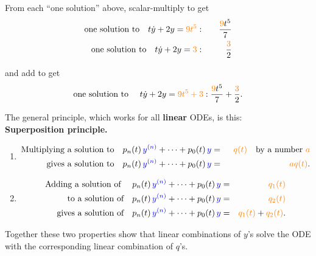 From each ``one solution'' above, scalar-multiply to get
\begin{eqnarray*}
  \displaystyle  \text {one solution to} \quad
  \displaystyle  t \dot{y} + 2 y = {\color{orange}{9}} {\color{orange}{t^5}}
  & : & \quad \displaystyle  \frac{{\color{orange}{9}} t^5}{7} \\ 
  \displaystyle  \text {one solution to} \quad
  \displaystyle  t \dot{y} + 2 y = {\color{orange}{3}}
  & : & \quad \displaystyle  \frac{{\color{orange}{3}}}{2}   
\end{eqnarray*}

and add to get
\begin{equation*}
  \displaystyle  \text {one solution to }\quad
  \displaystyle  t \dot{y} + 2 y = {\color{orange}{9}} {\color{orange}{t^5+{}}} {\color{orange}{3}} :
  \displaystyle  \frac{{\color{orange}{9}} t^5}{7} + \frac{{\color{orange}{3}} }{2} .
\end{equation*}

The general principle, which works for all \textbf{linear} ODEs, is this:\\

\textbf{Superposition principle.} \\
\begin{enumerate}
\item
  \begin{eqnarray*}
    \displaystyle  \text {Multiplying a solution to}\quad p_ n(t) \,
    {\color{blue}{y^{(n)}}}  + \cdots + p_0(t) \,  {\color{blue}{y}}
    \displaystyle &=& {\color{orange}{\phantom{a} q(t)}}  \quad \text {by a number } {\color{orange}{a}} \\
    \displaystyle \text {gives a solution to}\quad p_ n(t) \,
    {\color{blue}{y^{(n)}}}  + \cdots + p_0(t) \,  {\color{blue}{y}}
    \displaystyle &=& {\color{orange}{a}} {\color{orange}{q(t)}} .
  \end{eqnarray*}
\item
  \begin{eqnarray*}
    \displaystyle  \text {Adding a solution of }\quad p_ n(t) \,
    {\color{blue}{y^{(n)}}}  + \cdots + p_0(t) \,  {\color{blue}{y}}
    \displaystyle &=& {\color{orange}{q_1(t)}} \\
    \displaystyle \text {to a solution of}\quad p_ n(t) \,
    {\color{blue}{y^{(n)}}}  + \cdots + p_0(t) \,  {\color{blue}{y}}
    \displaystyle &=& {\color{orange}{q_2(t)}} \\
    \displaystyle \text {gives a solution of}\quad p_ n(t) \,
    {\color{blue}{y^{(n)}}}  + \cdots + p_0(t) \,  {\color{blue}{y}}
    \displaystyle &=& {\color{orange}{q_1(t)}}  + {\color{orange}{q_2(t)}} .
  \end{eqnarray*}
  
\end{enumerate}
Together these two properties show that linear combinations of $y$'s
solve the ODE with the corresponding linear combination of $q$'s.
\clearpage

